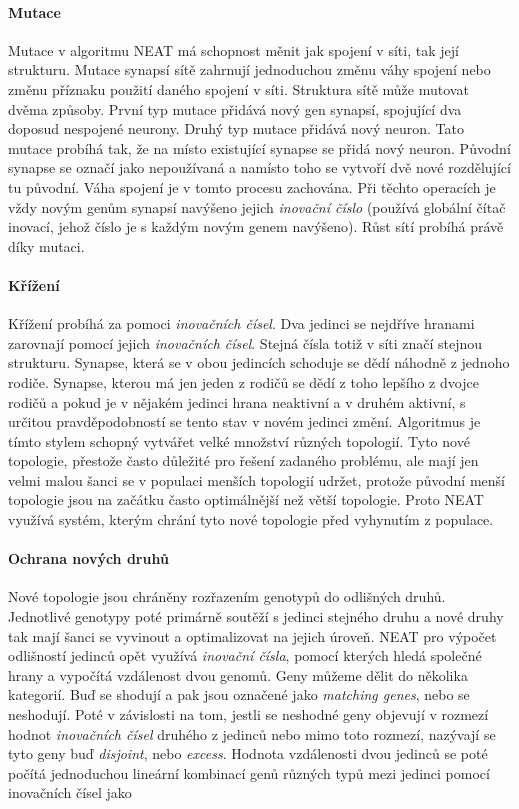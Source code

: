 \paragraph{Mutace}
Mutace v algoritmu NEAT má schopnost měnit jak spojení v síti, tak její
strukturu. Mutace synapsí sítě zahrnují jednoduchou změnu váhy spojení nebo
změnu příznaku použití daného spojení v síti. Struktura sítě může mutovat
dvěma způsoby. První typ mutace přidává nový gen synapsí, spojující dva doposud
nespojené neurony. Druhý typ mutace přidává nový neuron. Tato mutace probíhá
tak, že na místo existující synapse se přidá nový neuron. Původní synapse se
označí jako nepoužívaná a namísto toho se vytvoří dvě nové rozdělující tu
původní. Váha spojení je v tomto procesu zachována. Při těchto operacích je
vždy novým genům synapsí navýšeno jejich \emph{inovační číslo} (používá
globální čítač inovací, jehož číslo je s každým novým genem navýšeno). Růst
sítí probíhá právě díky mutaci.

\paragraph{Křížení}
Křížení probíhá za pomoci \emph{inovačních čísel}. Dva jedinci se nejdříve
hranami zarovnají pomocí jejich \emph{inovačních čísel}. Stejná čísla totiž v
síti značí stejnou strukturu. Synapse, která se v obou jedincích schoduje se
dědí náhodně z jednoho rodiče. Synapse, kterou má jen jeden z rodičů se dědí z
toho lepšího z dvojce rodičů a pokud je v nějakém jedinci hrana neaktivní a v
druhém aktivní, s určitou pravděpodobností se tento stav v novém jedinci změní.
Algoritmus je tímto stylem schopný vytvářet velké množství různých topologií.
Tyto nové topologie, přestože často důležité pro řešení zadaného problému, ale
mají jen velmi malou šanci se v populaci menších topologií udržet, protože
původní menší topologie jsou na začátku často optimálnější než větší topologie.
Proto NEAT využívá systém, kterým chrání tyto nové topologie před vyhynutím z
populace.

\paragraph{Ochrana nových druhů}
Nové topologie jsou chráněny rozřazením genotypů do odlišných druhů. Jednotlivé
genotypy poté primárně soutěží s jedinci stejného druhu a nové druhy tak mají
šanci se vyvinout a optimalizovat na jejich úroveň. NEAT pro výpočet odlišností
jedinců opět využívá \emph{inovační čísla}, pomocí kterých hledá společné hrany
a vypočítá vzdálenost dvou genomů. Geny můžeme dělit do několika kategorií. Buď
se shodují a pak jsou označené jako \emph{matching genes}, nebo se neshodují.
Poté v závislosti na tom, jestli se neshodné geny objevují v rozmezí hodnot
\emph{inovačních čísel} druhého z jedinců nebo mimo toto rozmezí, nazývají se
tyto geny buď \emph{disjoint}, nebo \emph{excess}. Hodnota vzdálenosti dvou
jedinců se poté počítá jednoduchou lineární kombinací genů různých typů mezi
jedinci pomocí inovačních čísel jako

